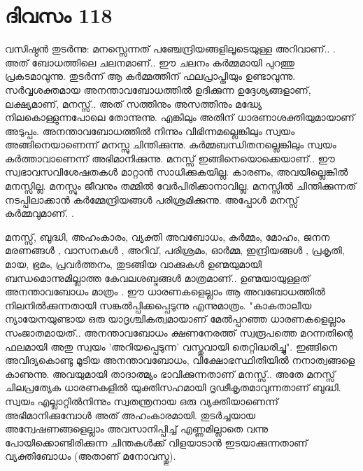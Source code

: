 \newpage
\section{ദിവസം 118}


വസിഷ്ഠന്‍ തുടര്‍ന്നു: മനസ്സെന്നത്‌ പഞ്ചേന്ദ്രിയങ്ങളിലൂടെയുള്ള അറിവാണ്‌.. . അത്‌ ബോധത്തിലെ ചലനമാണ്‌.. ഈ ചലനം കര്‍മ്മമായി പുറത്തു പ്രകടമാവുന്നു. തുടര്‍ന്ന് ആ കര്‍മ്മത്തിന്‌ ഫലപ്രാപ്തിയും ഉണ്ടാവുന്നു. സര്‍വ്വശക്തമായ അനന്താവബോധത്തില്‍ ഉദിക്കുന്ന ഉദ്ദേശ്യങ്ങളാണ്‌, ലക്ഷ്യമാണ്‌, മനസ്സ്‌.. അത്‌ സത്തിനും അസത്തിനും മദ്ധ്യേ നിലകൊള്ളുന്നപോലെ തോന്നുന്നു. എങ്കിലും അതിന്‌ ധാരണാശക്തിയുമായാണ്‌ അടുപ്പം. അനന്താവബോധത്തില്‍ നിന്നും വിഭിന്നമല്ലെങ്കിലും സ്വയം അങ്ങിനെയാണെന്ന് മനസ്സു ചിന്തിക്കുന്നു. കര്‍മ്മബന്ധിതനല്ലെങ്കിലും സ്വയം കര്‍ത്താവാണെന്ന് അഭിമാനിക്കുന്നു. മനസ്സ്‌ ഇങ്ങിനെയൊക്കെയാണ്‌.. ഈ സ്വഭാവസവിശേഷതകള്‍ മാറ്റാന്‍ സാധിക്കുകയില്ല. കാരണം, അവയില്ലെങ്കില്‍ മനസ്സില്ല. മനസ്സും ജീവനും തമ്മില്‍ വേര്‍പിരിക്കാനാവില്ല. മനസ്സില്‍ ചിന്തിക്കുന്നത്‌ നടപ്പിലാക്കാന്‍ കര്‍മ്മേന്ദ്രിയങ്ങള്‍ പരിശ്രമിക്കുന്നു. അപ്പോള്‍ മനസ്സ്‌ കര്‍മ്മവുമാണ്‌. .

മനസ്സ്‌, ബുദ്ധി, അഹംകാരം, വ്യക്തി അവബോധം, കര്‍മ്മം, മോഹം, ജനന മരണങ്ങള്‍ , വാസനകള്‍ , അറിവ്‌, പരിശ്രമം, ഓര്‍മ്മ, ഇന്ദ്രിയങ്ങള്‍ , പ്രകൃതി, മായ, ഭ്രമം, പ്രവര്‍ത്തനം, തുടങ്ങിയ വാക്കുകള്‍ ഉണ്മയുമായി ബന്ധമൊന്നുമില്ലാത്ത കേവലശബ്ദങ്ങള്‍ മാത്രമാണ്‌.. ഉണ്മയായുള്ളത്‌ അനന്താവബോധം മാത്രം .  ഈ ധാരണകളെല്ലാം ആ അവബോധത്തില്‍ നിലനില്‍ക്കുന്നതായി സങ്കല്‍പ്പിക്കപ്പെടുന്നു എന്നുമാത്രം. "കാകതാലീയ ന്യായേനയുണ്ടായ ഒരു യാദൃശ്ചികത്വമായാണ്‌ മേല്‍പ്പറഞ്ഞ ധാരണകളെല്ലാം സംജാതമായത്‌.. അനന്താവബോധം ക്ഷണനേരത്ത്‌ സ്വരൂപത്തെ മറന്നതിന്റെ ഫലമായി അതു സ്വയം 'അറിയപ്പെടുന്ന' വസ്തുവായി തെറ്റിദ്ധരിച്ചു". ഇങ്ങിനെ അവിദ്യകൊണ്ടു മൂടിയ അനന്താവബോധം, വിക്ഷോഭസ്ഥിതിയില്‍ നനാത്വങ്ങളെ കാണുന്നു. അവയുമായി താദാത്മ്യം ഭാവിക്കുന്നതാണ്‌ മനസ്സ്‌.. അതേ മനസ്സ്‌ ചിലപ്രത്യേക ധാരണകളില്‍ യുക്തിസഹമായി ദൃഢീകൃതമാവുന്നതാണ്‌ ബുദ്ധി. സ്വയം എല്ലാറ്റില്‍നിന്നും സ്വതന്ത്രനായ ഒരു വ്യക്തിയാണെന്ന് അഭിമാനിക്കുമ്പോള്‍ അത്‌ അഹംകാരമായി. തുടര്‍ച്ചയായ അന്വേഷണങ്ങളെല്ലാം അവസാനിപ്പിച്ച്‌ എണ്ണമില്ലാതെ വന്നു പോയിക്കൊണ്ടിരിക്കുന്ന ചിന്തകള്‍ക്ക്‌ വിളയാടാന്‍ ഇടയാക്കുന്നതാണ്‌ വ്യക്തിബോധം (അതാണ് മനോവസ്തു).

